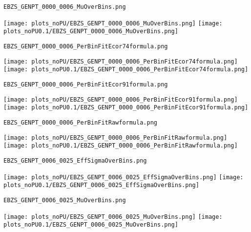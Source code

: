 \begin{frame}[fragile]
\begin{verbatim}
EBZS_GENPT_0000_0006_MuOverBins.png
\end{verbatim}
\texttt{[image: plots\_noPU/EBZS\_GENPT\_0000\_0006\_MuOverBins.png]}
\texttt{[image: plots\_noPU0.1/EBZS\_GENPT\_0000\_0006\_MuOverBins.png]}
\end{frame}
\begin{frame}[fragile]
\begin{verbatim}
EBZS_GENPT_0000_0006_PerBinFitEcor74formula.png
\end{verbatim}
\texttt{[image: plots\_noPU/EBZS\_GENPT\_0000\_0006\_PerBinFitEcor74formula.png]}
\texttt{[image: plots\_noPU0.1/EBZS\_GENPT\_0000\_0006\_PerBinFitEcor74formula.png]}
\end{frame}
\begin{frame}[fragile]
\begin{verbatim}
EBZS_GENPT_0000_0006_PerBinFitEcor91formula.png
\end{verbatim}
\texttt{[image: plots\_noPU/EBZS\_GENPT\_0000\_0006\_PerBinFitEcor91formula.png]}
\texttt{[image: plots\_noPU0.1/EBZS\_GENPT\_0000\_0006\_PerBinFitEcor91formula.png]}
\end{frame}
\begin{frame}[fragile]
\begin{verbatim}
EBZS_GENPT_0000_0006_PerBinFitRawformula.png
\end{verbatim}
\texttt{[image: plots\_noPU/EBZS\_GENPT\_0000\_0006\_PerBinFitRawformula.png]}
\texttt{[image: plots\_noPU0.1/EBZS\_GENPT\_0000\_0006\_PerBinFitRawformula.png]}
\end{frame}
\begin{frame}[fragile]
\begin{verbatim}
EBZS_GENPT_0006_0025_EffSigmaOverBins.png
\end{verbatim}
\texttt{[image: plots\_noPU/EBZS\_GENPT\_0006\_0025\_EffSigmaOverBins.png]}
\texttt{[image: plots\_noPU0.1/EBZS\_GENPT\_0006\_0025\_EffSigmaOverBins.png]}
\end{frame}
\begin{frame}[fragile]
\begin{verbatim}
EBZS_GENPT_0006_0025_MuOverBins.png
\end{verbatim}
\texttt{[image: plots\_noPU/EBZS\_GENPT\_0006\_0025\_MuOverBins.png]}
\texttt{[image: plots\_noPU0.1/EBZS\_GENPT\_0006\_0025\_MuOverBins.png]}
\end{frame}
